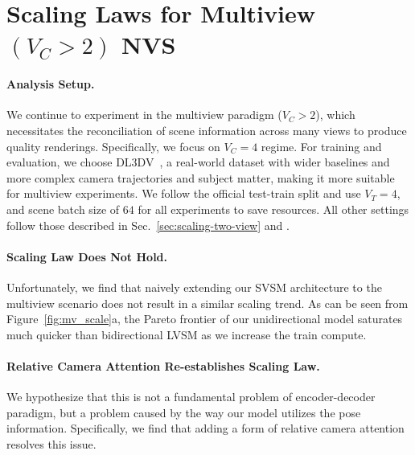 \section{Scaling Laws for Multiview \boldmath\texorpdfstring{$\left(V_C{>}2\right)$}{(Vc>2)} NVS}
% 
\label{sec:scaling-mv}

\paragraph{Analysis Setup.}
%
We continue to experiment in the multiview paradigm ($V_C{>}2$), which necessitates the reconciliation of scene information across many views to produce quality renderings. Specifically, we focus on $V_C = 4$ regime. For training and evaluation, we choose DL3DV~\citep{ling2024dl3dv}, a real-world dataset with wider baselines and more complex camera trajectories and subject matter, making it more suitable for multiview experiments. We follow the official test-train split and use $V_T{=}4$, and scene batch size of $64$ for all experiments to save resources. %
 All other settings follow those described in Sec.~\ref{sec:scaling-two-view} and .



\paragraph{Scaling Law Does Not Hold.}
%
Unfortunately, we find that naively extending our SVSM architecture to the multiview scenario does not result in a similar scaling trend. As can be seen from Figure~\ref{fig:mv_scale}a, the Pareto frontier of our unidirectional model saturates much quicker than bidirectional LVSM as we increase the train compute. 



\vspace{-1\baselineskip}
\paragraph{Relative Camera Attention Re-establishes Scaling Law.}
%
We hypothesize that this is not a fundamental problem of encoder-decoder paradigm, but a problem caused by the way our model utilizes the pose information. Specifically, we find that adding a form of relative camera attention~\citep{miyato2023gta,kong2024eschernet,li2025cameras} resolves this issue. 

